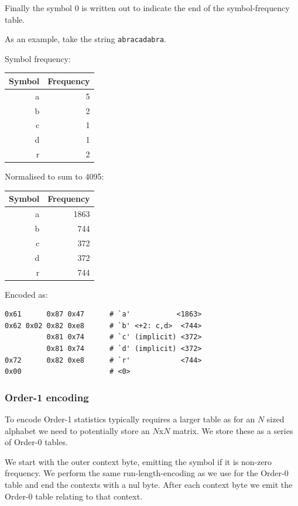 \documentclass[a4paper]{article}
\begin{document}
Finally the symbol 0 is written out to indicate the end of the
symbol-frequency table.

As an example, take the string \texttt{abracadabra}.

\begin{minipage}[t]{0.5\textwidth}
Symbol frequency:
\\[8pt]
\begin{tabular}{ |r|r| }
\hline
Symbol & Frequency\\
\hline
a & 5 \\
b & 2 \\
c & 1 \\
d & 1 \\
r & 2 \\
\hline
\end{tabular}
\end{minipage}
\begin{minipage}[t]{0.5\textwidth}
Normalised to sum to 4095:
\\[8pt]
\begin{tabular}{ |r|r|}
\hline
Symbol & Frequency\\
\hline
a & 1863 \\
b &  744 \\
c &  372 \\
d &  372 \\
r &  744 \\
\hline
\end{tabular}
\end{minipage}

Encoded as:
\begin{verbatim}
0x61      0x87 0x47      # `a'           <1863>
0x62 0x02 0x82 0xe8      # `b' <+2: c,d>  <744>
          0x81 0x74      # `c' (implicit) <372>
          0x81 0x74      # `d' (implicit) <372>
0x72      0x82 0xe8      # `r'            <744>
0x00                     # <0>
\end{verbatim}


\subsubsection*{Order-1 encoding}

To encode Order-1 statistics typically requires a larger table as for
an $N$ sized alphabet we need to potentially store an $N$x$N$ matrix.
We store these as a series of Order-0 tables.

We start with the outer context byte, emitting the symbol if it is
non-zero frequency.  We perform the same run-length-encoding as we
use for the Order-0 table and end the contexts with a nul byte.  After
each context byte we emit the Order-0 table relating to that context.
\end{document}
